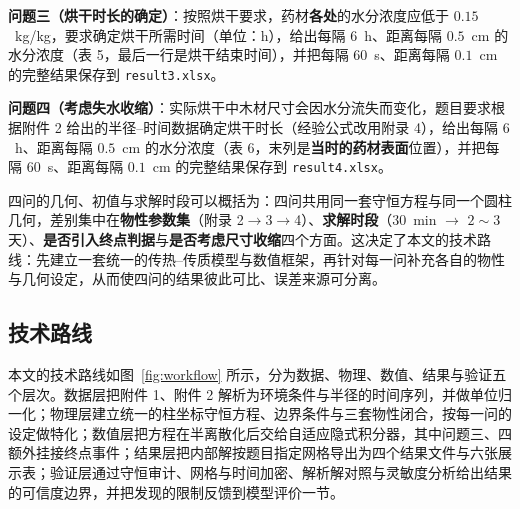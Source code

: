 \textbf{问题三（烘干时长的确定）}：按照烘干要求，药材\textbf{各处}的水分浓度应低于 $0.15$~kg/kg，要求确定烘干所需时间（单位：h），给出每隔 $6$~h、距离每隔 $0.5$~cm 的水分浓度（表 5，最后一行是烘干结束时间），并把每隔 $60$~s、距离每隔 $0.1$~cm 的完整结果保存到 \texttt{result3.xlsx}。

\textbf{问题四（考虑失水收缩）}：实际烘干中木材尺寸会因水分流失而变化，题目要求根据附件 2 给出的半径--时间数据确定烘干时长（经验公式改用附录 4），给出每隔 $6$~h、距离每隔 $0.5$~cm 的水分浓度（表 6，末列是\textbf{当时的药材表面}位置），并把每隔 $60$~s、距离每隔 $0.1$~cm 的完整结果保存到 \texttt{result4.xlsx}。

四问的几何、初值与求解时段可以概括为：四问共用同一套守恒方程与同一个圆柱几何，差别集中在\textbf{物性参数集}（附录 2$\to$3$\to$4）、\textbf{求解时段}（$30$~min $\to$ $2\sim3$ 天）、\textbf{是否引入终点判据}与\textbf{是否考虑尺寸收缩}四个方面。这决定了本文的技术路线：先建立一套统一的传热--传质模型与数值框架，再针对每一问补充各自的物性与几何设定，从而使四问的结果彼此可比、误差来源可分离。


\subsection{技术路线}

本文的技术路线如图~\ref{fig:workflow} 所示，分为数据、物理、数值、结果与验证五个层次。数据层把附件 1、附件 2 解析为环境条件与半径的时间序列，并做单位归一化；物理层建立统一的柱坐标守恒方程、边界条件与三套物性闭合，按每一问的设定做特化；数值层把方程在半离散化后交给自适应隐式积分器，其中问题三、四额外挂接终点事件；结果层把内部解按题目指定网格导出为四个结果文件与六张展示表；验证层通过守恒审计、网格与时间加密、解析解对照与灵敏度分析给出结果的可信度边界，并把发现的限制反馈到模型评价一节。

